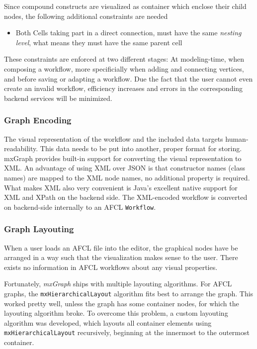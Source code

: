 \documentclass[a4paper,12pt,pdftex,halfparskip,cleardoubleempty,bibtotoc,liststotoc]{scrbook}
\begin{document}
Since compound constructs are visualized as container which enclose their child nodes, the following additional constraints are needed

\begin{itemize}
	\item Both \textsf{Cell}s taking part in a direct connection, must have the same \textit{nesting level}, what means they must have the same parent cell
\end{itemize}

These constraints are enforced at two different stages: At modeling-time, when composing a workflow, more specificially when adding and connecting vertices, and before saving or adapting a workflow.
Due the fact that the user cannot even create an invalid workflow, efficiency increases and errors in the corresponding backend services will be minimized.


\subsubsection{Graph Encoding}

The visual representation of the workflow and the included data targets human-readability. This data needs to be put into another, proper format for storing. mxGraph provides built-in support for converting the visual representation to XML. An advantage of using XML over JSON is that constructor names (class names) are mapped to the XML node names, no additional property is required.
What makes XML also very convenient is Java's excellent native support for XML and XPath on the backend side. The XML-encoded workflow is converted on backend-side internally to an AFCL \texttt{Workflow}.


\subsubsection{Graph Layouting}

When a user loads an AFCL file into the editor, the graphical nodes have be arranged in a way such that the visualization makes sense to the user. There exists no information in AFCL workflows about any visual properties. 

Fortunately, \textit{mxGraph} ships with multiple layouting algorithms.
For AFCL graphs, the \texttt{mxHierarchicalLayout} algorithm fits best to arrange the graph. This worked pretty well, unless the graph has some container nodes, for which the layouting algorithm broke.
To overcome this problem, a custom layouting algorithm was developed, which layouts all container elements using \texttt{mxHierarchicalLayout} recursively, beginning at the innermost to the outermost container.
\end{document}
